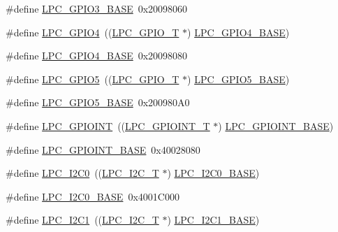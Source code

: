\begin{DoxyCompactItemize}
\item 
\#define \hyperlink{group__PERIPH__407X__8X__BASE_ga56c68c5326b521b3278a35f4d81369a9}{L\+P\+C\+\_\+\+G\+P\+I\+O3\+\_\+\+B\+A\+SE}~0x20098060
\item 
\#define \hyperlink{group__PERIPH__407X__8X__BASE_ga652a560a972d4edec8a67cd85ad4bd60}{L\+P\+C\+\_\+\+G\+P\+I\+O4}~((\hyperlink{structLPC__GPIO__T}{L\+P\+C\+\_\+\+G\+P\+I\+O\+\_\+T}             $\ast$) \hyperlink{group__PERIPH__407X__8X__BASE_gaa54352e7745932e78b56bcbc1d70fa21}{L\+P\+C\+\_\+\+G\+P\+I\+O4\+\_\+\+B\+A\+SE})
\item 
\#define \hyperlink{group__PERIPH__407X__8X__BASE_gaa54352e7745932e78b56bcbc1d70fa21}{L\+P\+C\+\_\+\+G\+P\+I\+O4\+\_\+\+B\+A\+SE}~0x20098080
\item 
\#define \hyperlink{group__PERIPH__407X__8X__BASE_gad41551ad62a13c91b7fff17e4340cb69}{L\+P\+C\+\_\+\+G\+P\+I\+O5}~((\hyperlink{structLPC__GPIO__T}{L\+P\+C\+\_\+\+G\+P\+I\+O\+\_\+T}             $\ast$) \hyperlink{group__PERIPH__407X__8X__BASE_gaf6bbc732156be98ff8a4d15fa7558ad6}{L\+P\+C\+\_\+\+G\+P\+I\+O5\+\_\+\+B\+A\+SE})
\item 
\#define \hyperlink{group__PERIPH__407X__8X__BASE_gaf6bbc732156be98ff8a4d15fa7558ad6}{L\+P\+C\+\_\+\+G\+P\+I\+O5\+\_\+\+B\+A\+SE}~0x200980\+A0
\item 
\#define \hyperlink{group__PERIPH__407X__8X__BASE_gaefe2f52407c1ce58395766dc760525b5}{L\+P\+C\+\_\+\+G\+P\+I\+O\+I\+NT}~((\hyperlink{structLPC__GPIOINT__T}{L\+P\+C\+\_\+\+G\+P\+I\+O\+I\+N\+T\+\_\+T}          $\ast$) \hyperlink{group__PERIPH__407X__8X__BASE_gadf88491f4b83b5af99eaf30778cb62fa}{L\+P\+C\+\_\+\+G\+P\+I\+O\+I\+N\+T\+\_\+\+B\+A\+SE})
\item 
\#define \hyperlink{group__PERIPH__407X__8X__BASE_gadf88491f4b83b5af99eaf30778cb62fa}{L\+P\+C\+\_\+\+G\+P\+I\+O\+I\+N\+T\+\_\+\+B\+A\+SE}~0x40028080
\item 
\#define \hyperlink{group__PERIPH__407X__8X__BASE_ga14b6c56857e970a682a9bb22a0cb6716}{L\+P\+C\+\_\+\+I2\+C0}~((\hyperlink{structLPC__I2C__T}{L\+P\+C\+\_\+\+I2\+C\+\_\+T}              $\ast$) \hyperlink{group__PERIPH__407X__8X__BASE_gab4476c9e874621194369f74fcf26ce92}{L\+P\+C\+\_\+\+I2\+C0\+\_\+\+B\+A\+SE})
\item 
\#define \hyperlink{group__PERIPH__407X__8X__BASE_gab4476c9e874621194369f74fcf26ce92}{L\+P\+C\+\_\+\+I2\+C0\+\_\+\+B\+A\+SE}~0x4001\+C000
\item 
\#define \hyperlink{group__PERIPH__407X__8X__BASE_gad6d6333e47875813be171cffef258837}{L\+P\+C\+\_\+\+I2\+C1}~((\hyperlink{structLPC__I2C__T}{L\+P\+C\+\_\+\+I2\+C\+\_\+T}              $\ast$) \hyperlink{group__PERIPH__407X__8X__BASE_gae59f73cf24ff126be3b9a8b921926676}{L\+P\+C\+\_\+\+I2\+C1\+\_\+\+B\+A\+SE})

\end{DoxyCompactItemize}
